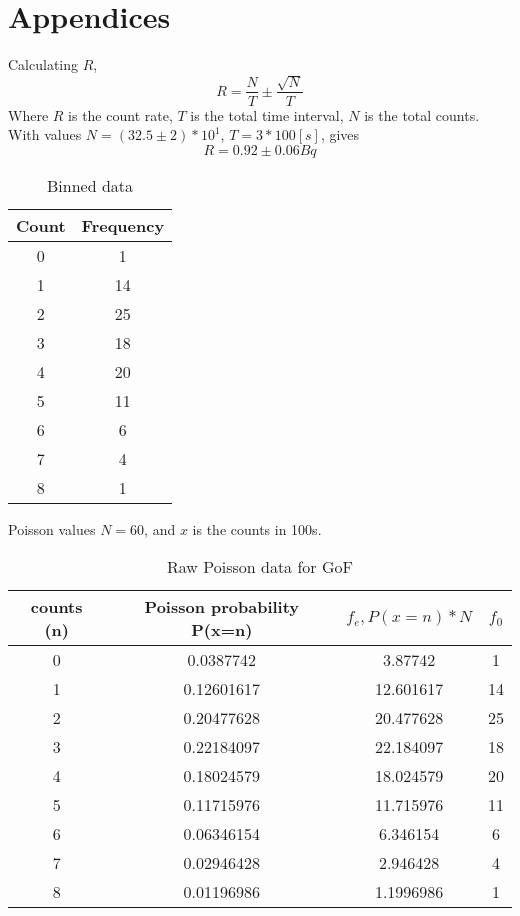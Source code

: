 \documentclass[11pt]{article}
\begin{document}
    \section{Appendices}
    Calculating $R$, $$ R = \frac{N}{T} \pm \frac{\sqrt{N}}{T}$$
  Where $R$ is the count rate, $T$ is the total time interval, $N$ is the total counts. With values $N =( 32.5 \pm 2) * 10^{1}$, $T= 3 * 100 [s]$, gives 
  $$R = 0.92 \pm 0.06  Bq$$ 
    \begin{table}[b]
        \centering
        \begin{tabular}{|c|c|}
        \hline
          \textbf{Count}  & \textbf{Frequency} \\
          \hline
           0  & 1 \\
           1 & 14\\
           2  & 25 \\
           3  & 18 \\
           4  & 20 \\
           5  & 11 \\
           6  & 6\\
           7  & 4 \\
           8  & 1 \\
           
           \hline
        \end{tabular}
        \caption{Binned data}
        \label{tab:my_label}
    \end{table}
    Poisson values 
    $N = 60$, and $x$ is the counts in 100s. 
    \begin{table}[]
        \centering
        \begin{tabular}{|c|c|c|c|}
         \hline
           counts (n)  & Poisson probability P(x=n) & $ f_{e}, P(x=n) * N$ & $f_{0}$ \\
            \hline
            0 & 0.0387742 & 3.87742 & 1 \\
            1 & 0.12601617 & 12.601617 & 14\\
            2 & 0.20477628 & 20.477628 & 25\\
            3 & 0.22184097 & 22.184097 & 18\\
            4 & 0.18024579 & 18.024579 & 20\\
            5 & 0.11715976 & 11.715976 & 11\\
            6 & 0.06346154 & 6.346154 & 6 \\
            7 & 0.02946428 & 2.946428 & 4\\
            8 & 0.01196986 & 1.1996986 & 1\\
             \hline

        \end{tabular}
        \caption{Raw Poisson data for GoF}
        \label{tab:my_label}
    \end{table}
\end{document}
